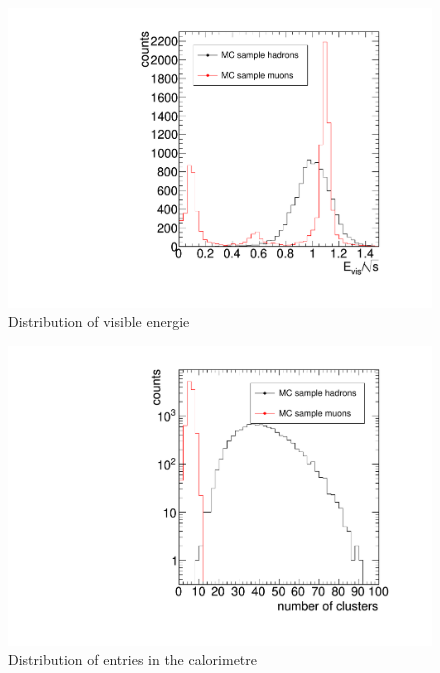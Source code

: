 \documentclass[epj,nopacs]{svjour}
\begin{document}
\begin{figure}[htb]
 \centering
 \includegraphics[width=1\columnwidth,keepaspectratio]{E_vis}
 \caption{Distribution of visible energie}
 \label{fig:e_vis}
\end{figure}

\begin{figure}[htb]
 \centering
 \includegraphics[width=1\columnwidth,keepaspectratio]{N_Cluster}
 \caption{Distribution of entries in the calorimetre}
 \label{fig:n_cluster}
\end{figure}
\end{document}
